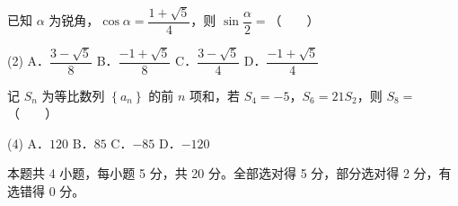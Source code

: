 \begin{question}
已知 $\alpha$ 为锐角，$\cos\alpha=\dfrac{1+\sqrt5}4$，则 $\sin\dfrac\alpha2=$（　　）

\begin{gkopts}(2)
\task A．$\dfrac{3-\sqrt5}8$
\task B．$\dfrac{-1+\sqrt5}8$
\task C．$\dfrac{3-\sqrt5}4$
\task D．$\dfrac{-1+\sqrt5}4$
\end{gkopts}

\end{question}
\begin{question}
记 $S_n$ 为等比数列 $\left\{a_n\right\}$ 的前 $n$ 项和，若 $S_4=-5$，$S_6=21S_2$，则 $S_8=$（　　）

\begin{gkopts}(4)
\task A．$120$
\task B．$85$
\task C．$-85$
\task D．$-120$
\end{gkopts}

\par\medskip

\end{question}

\begin{gktip}
本题共 4 小题，每小题 5 分，共 20 分。全部选对得 5 分，部分选对得 2 分，有选错得 0 分。
\end{gktip}

